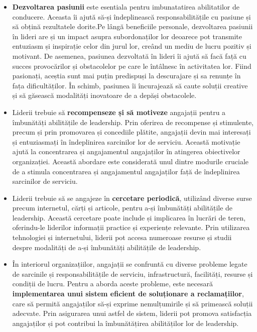 \documentclass[a4paper, 12pt]{article}
\begin{document}
	\begin{itemize}

	\item\textbf{ Dezvoltarea pasiunii} este esentiala pentru imbunatatirea abilitatilor de conducere. Aceasta îi ajută să-și îndeplinească responsabilitățile cu pasiune și să obțină rezultatele dorite.Pe lângă beneficiile personale, dezvoltarea pasiunii în lideri are și un impact asupra subordonaților lor deoarece pot transmite entuziasm și inspirație celor din jurul lor, creând un mediu de lucru pozitiv și motivant. De asemenea, pasiunea dezvoltată în lideri îi ajută să facă față cu succes provocărilor și obstacolelor pe care le întâlnesc în activitatea lor. Fiind pasionați, aceștia sunt mai puțin predispuși la descurajare și  sa renunțe în fața dificultăților. În schimb, pasiunea îi încurajează să caute soluții creative și să găsească modalități inovatoare de a depăși obstacolele.

	\item Liderii trebuie să \textbf{recompenseze și să motiveze} angajații pentru a îmbunătăți abilitățile de leadership. Prin oferirea de recompense și stimulente, precum și prin promovarea și concediile plătite, angajații devin mai interesați și entuziasmați în îndeplinirea sarcinilor lor de serviciu. Această motivație ajută la concentrarea și angajamentul angajaților în atingerea obiectivelor organizației. Această abordare este considerată unul dintre modurile cruciale de a stimula concentrarea și angajamentul angajaților față de îndeplinirea sarcinilor de serviciu.

	\item Liderii trebuie să se angajeze în \textbf{cercetare periodică}, utilizând diverse surse precum internetul, cărți și articole, pentru a-și îmbunătăți abilitățile de leadership. Această cercetare poate include și implicarea în lucrări de teren, oferindu-le liderilor informații practice și experiențe relevante. Prin utilizarea tehnologiei și internetului, liderii pot accesa numeroase resurse și studii despre modalități de a-și îmbunătăți abilitățile de leadership.


	\item În interiorul organizațiilor, angajații se confruntă cu diverse probleme legate de sarcinile și responsabilitățile de serviciu, infrastructură, facilități, resurse și condiții de lucru. Pentru a aborda aceste probleme, este necesară \textbf{implementarea unui sistem eficient de soluționare a reclamațiilor}, care să permită angajaților să-și exprime nemulțumirile și să primească soluții adecvate. Prin asigurarea unui astfel de sistem, liderii pot promova satisfacția angajaților și pot contribui la îmbunătățirea abilităților lor de leadership.


\end{itemize}
\end{document}
